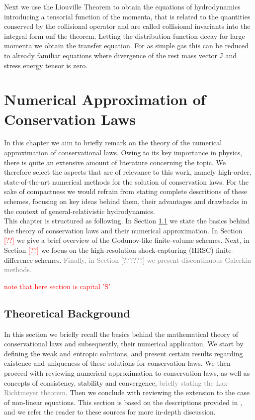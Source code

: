 \documentclass[11pt,a4paper,headinclude=true,DIV=14,BCOR=8mm,chapterprefix,listof=totoc,twoside,openright,abstracton]{scrbook}
\begin{document}
Next we use the Liouville Theorem to obtain the equations of hydrodynamics introducing a tensorial function of the momenta, that is related to the quantities conserved by the collisional operator and are called collisional invariants into the integral form onf the theorem. Letting the distribution function decay for large momenta we obtain the transfer equation. For as simple gas this can be reduced to already familiar equations where divergence of the rest mass vector J and stress energy tensor is zero. 



\chapter{Numerical Approximation of Conservation Laws}

In this chapter we aim to briefly remark on the theory of the numerical approximation of conservational laws. Owing to its key importance in physics, there is quite an extensive amount of literature concerning the topic. We therefore select the aspects that are of relevance to this work, namely high-order, state-of-the-art numerical methods for the solution of conservation laws. For the sake of compactness we would refrain from stating complete descritions of these schemes, focusing on key ideas behind them, their advantages and drawbacks in the context of general-relativistic hydrodynamics. \\

This chapter is structured as following. In Section \ref{sec:theory:conserv_laws:theorback} we state the basics behind the theory of conservation laws and their numerical approximation. In Section \textcolor{red}{[??]} we give a brief overview of the Godunov-like finite-volume schemes. Next, in Section \textcolor{red}{[??]} we focus on the high-resolution shock-capturing (HRSC) finite-difference schemes. \textcolor{gray}{Finally, in Section [??????] we present discontinuous Galerkin methods.}

\textcolor{red}{note that here section is capital 'S'}

\section{Theoretical Background}
\label{sec:theory:conserv_laws:theorback}

In this section we briefly recall the basics behind the mathematical theory of conservational laws and subsequently, their numerical application. We start by defining the weak and entropic solutions, and present certain results regarding existence and uniqueness of these solutions for conservation laws. We then proceed with reviewing numerical approximation to conservation laws, as well as concepts of consistency, stability and convergence, \textcolor{gray}{briefly stating the Lax-Richtmeyer theorem}. Then we conclude with reviewing the extension to the case of non-linear equations. This section is based on the descriptions provided in \cite{LeVeque:1992,Tadmor1998}, and we refer the reader to these sources for more in-depth discussion. \\
\end{document}
